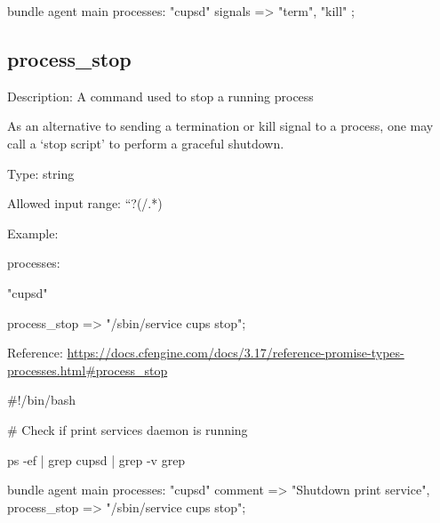 \begin{codelisting}
\begin{code}
bundle agent main
{
  processes:
      "cupsd"
        signals => { "term", "kill" };
}

\end{code}
\end{codelisting}





\subsection{process\_stop}

Description: A command used to stop a running process

As an alternative to sending a termination or kill signal to a process, one may call a `stop script' to perform a graceful shutdown.

Type: string

Allowed input range: ``?(/.*)

Example:

\begin{code}
  processes:

      "cupsd"

        process_stop => "/sbin/service cups stop";
\end{code}

Reference: \href{https://docs.cfengine.com/docs/3.17/reference-promise-types-processes.html#process_stop}{https://docs.cfengine.com/docs/3.17/reference-promise-types-processes.html\#process\_stop}

\begin{codelisting}
\begin{code}
#!/bin/bash

# Check if print services daemon is running

ps -ef | grep cupsd | grep -v grep
\end{code}
\end{codelisting}
\begin{codelisting}
\begin{code}
bundle agent main
{
  processes:
      "cupsd"
        comment => "Shutdown print service",
        process_stop => "/sbin/service cups stop";
}
\end{code}
\end{codelisting}






